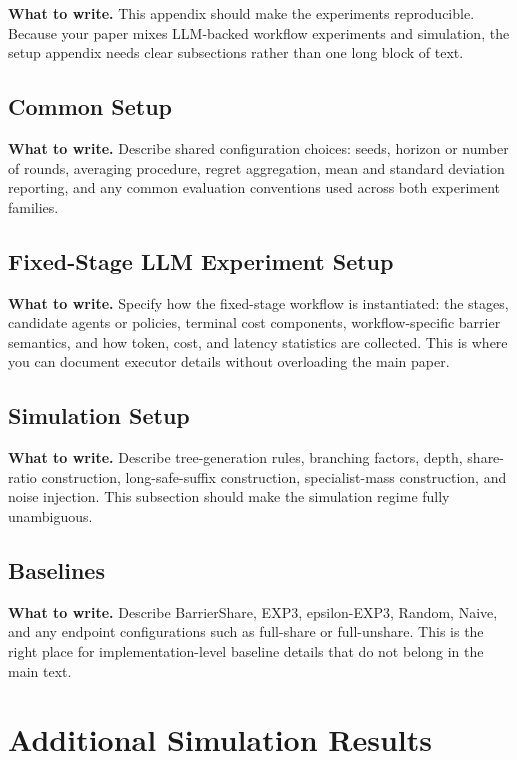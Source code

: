 \documentclass{article}
\newcommand{\towrite}[1]{\noindent\textbf{What to write.} #1}
\begin{document}
\towrite{This appendix should make the experiments reproducible. Because your paper mixes LLM-backed workflow experiments and simulation, the setup appendix needs clear subsections rather than one long block of text.}

\subsection{Common Setup}

\towrite{Describe shared configuration choices: seeds, horizon or number of rounds, averaging procedure, regret aggregation, mean and standard deviation reporting, and any common evaluation conventions used across both experiment families.}

\subsection{Fixed-Stage LLM Experiment Setup}

\towrite{Specify how the fixed-stage workflow is instantiated: the stages, candidate agents or policies, terminal cost components, workflow-specific barrier semantics, and how token, cost, and latency statistics are collected. This is where you can document executor details without overloading the main paper.}

\subsection{Simulation Setup}

\towrite{Describe tree-generation rules, branching factors, depth, share-ratio construction, long-safe-suffix construction, specialist-mass construction, and noise injection. This subsection should make the simulation regime fully unambiguous.}

\subsection{Baselines}

\towrite{Describe BarrierShare, EXP3, epsilon-EXP3, Random, Naive, and any endpoint configurations such as full-share or full-unshare. This is the right place for implementation-level baseline details that do not belong in the main text.}

\section{Additional Simulation Results}
\end{document}
